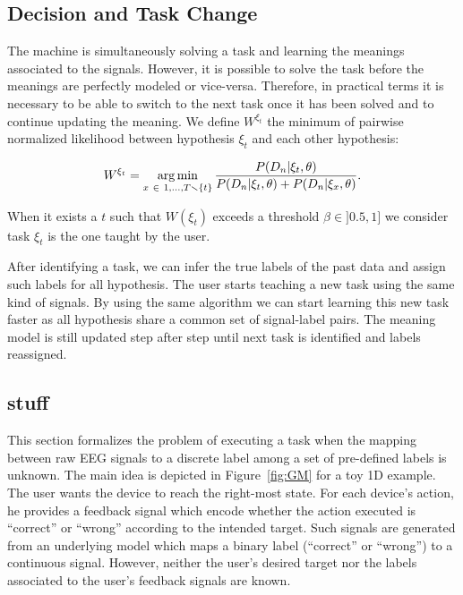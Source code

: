 \subsection{Decision and Task Change}

The machine is simultaneously solving a task and learning the meanings associated to the signals. However, it is possible to solve the task before the meanings are perfectly modeled or vice-versa. Therefore, in practical terms it is necessary to be able to switch to the next task once it has been solved and to continue updating the meaning. 
%
We define $W^{\xi_t}$ the minimum of pairwise normalized likelihood between hypothesis $\xi_t$ and each other hypothesis: 

\begin{eqnarray}
W^{\xi_t} = \argmin_{x~\in~{1, \ldots, T} \smallsetminus \{t\}} \frac{P(D_n | \xi_t, \theta)}{P(D_n | \xi_t, \theta) + P(D_n | \xi_x, \theta)}.
\label{eq:weight}
\end{eqnarray}

When it exists a $t$ such that $W(\xi_t)$ exceeds a threshold $\beta \in ]0.5,1]$ we consider task $\xi_t$ is the one taught by the user.

After identifying a task, we can infer the true labels of the past data and assign such labels for all hypothesis. The user starts teaching a new task using the same kind of signals. By using the same algorithm we can start learning this new task faster as all hypothesis share a common set of signal-label pairs. The meaning model is still updated step after step until next task is identified and labels reassigned.

\subsection{stuff}


This section formalizes the problem of executing a task when the mapping between raw EEG signals to a discrete label among a set of pre-defined labels is unknown. The main idea is depicted in Figure~\ref{fig:GM} for a toy 1D example. The user wants the device to reach the right-most state. For each device's action, he provides a feedback signal which encode whether the action executed is ``correct'' or ``wrong'' according to the intended target. Such signals are generated from an underlying model which maps a binary label (``correct'' or ``wrong'') to a continuous signal. However, neither the user's desired target nor the labels associated to the user's feedback signals are known.

